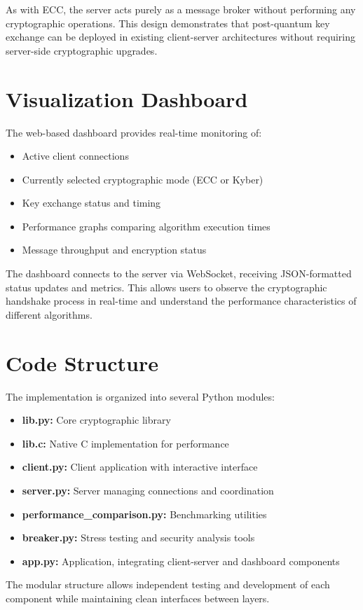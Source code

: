 As with ECC, the server acts purely as a message broker without performing any cryptographic operations. This design demonstrates that post-quantum key exchange can be deployed in existing client-server architectures without requiring server-side cryptographic upgrades.

\section{Visualization Dashboard}

The web-based dashboard provides real-time monitoring of:

\begin{itemize}
\item Active client connections
\item Currently selected cryptographic mode (ECC or Kyber)
\item Key exchange status and timing
\item Performance graphs comparing algorithm execution times
\item Message throughput and encryption status
\end{itemize}

The dashboard connects to the server via WebSocket, receiving JSON-formatted status updates and metrics. This allows users to observe the cryptographic handshake process in real-time and understand the performance characteristics of different algorithms.

\section{Code Structure}

The implementation is organized into several Python modules:

\begin{itemize}
\item \textbf{lib.py:} Core cryptographic library
\item \textbf{lib.c:} Native C implementation for performance
\item \textbf{client.py:} Client application with interactive interface 
\item \textbf{server.py:} Server managing connections and coordination
\item \textbf{performance\_comparison.py:} Benchmarking utilities
\item \textbf{breaker.py:} Stress testing and security analysis tools
\item \textbf{app.py:} Application, integrating client-server and dashboard components
\end{itemize}

The modular structure allows independent testing and development of each component while maintaining clean interfaces between layers.
 
